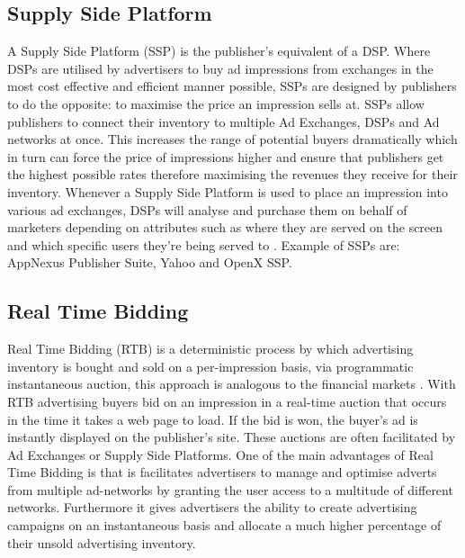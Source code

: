 \documentclass{article}
\begin{document}
\subsection{Supply Side Platform} \label{SSP}
A Supply Side Platform (SSP) is the publisher's equivalent of a DSP. Where DSPs are utilised by advertisers to buy ad impressions from exchanges in the most cost effective and efficient manner possible, SSPs are designed by publishers to do the opposite: to maximise the price an impression sells at. SSPs allow publishers to connect their inventory to multiple Ad Exchanges, DSPs and Ad networks at once. This increases the range of potential buyers dramatically which in turn can force the price of impressions higher and ensure that publishers get the highest possible rates therefore maximising the revenues they receive for their inventory. Whenever a Supply Side Platform is used to place an impression into various ad exchanges, DSPs will analyse and purchase them on behalf of marketers depending on attributes such as where they are served on the screen and which specific users they're being served to \parencite{introDSP}. Example of SSPs are: AppNexus Publisher Suite, Yahoo and OpenX SSP.  

\subsection{Real Time Bidding}
Real Time Bidding (RTB) is a deterministic process by which advertising inventory is bought and sold on a per-impression basis, via programmatic instantaneous auction, this approach is analogous to the financial markets \parencite{RTB}. With RTB advertising buyers bid on an impression in a real-time auction that occurs in the time it takes a web page to load. If the bid is won, the buyer's ad is instantly displayed on the publisher's site. These auctions are often facilitated by Ad Exchanges or Supply Side Platforms. One of the main advantages of Real Time Bidding is that is facilitates advertisers to manage and optimise adverts from multiple ad-networks by granting the user access to a multitude of different networks. Furthermore it gives advertisers the ability to create advertising campaigns on an instantaneous basis and allocate a much higher percentage of their unsold advertising inventory. \newline
\end{document}
